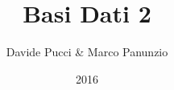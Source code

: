 

\title{Basi Dati 2}
\author{Davide Pucci & Marco Panunzio}
\date{2016}

\maketitle

\tableofcontents

%

